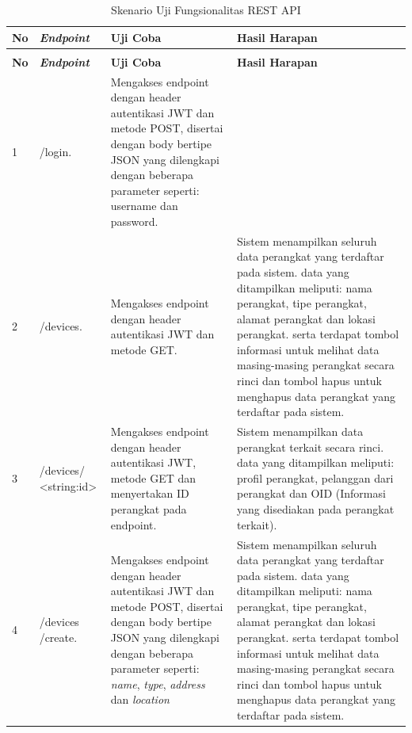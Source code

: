             \begin{longtable}{|p{}|p{}|p{}|p{}|}					\caption{Skenario Uji Fungsionalitas REST API} \label{ujirestapi} \\
            	\hline
            	\textbf{No} & \textbf{\textit{Endpoint}} & \textbf{Uji Coba} & \textbf{Hasil Harapan} \\ \hline
            	\endfirsthead
            	\caption[]{Skenario Uji Fungsionalitas REST API} \\
            	\hline
            	\textbf{No} & \textbf{\textit{Endpoint}} & \textbf{Uji Coba} & \textbf{Hasil Harapan} \\ \hline
            	\endhead
            	\endfoot
            	\endlastfoot
            	
            	1 & /login. & Mengakses endpoint dengan header autentikasi JWT dan metode POST, disertai dengan body bertipe JSON yang dilengkapi dengan beberapa parameter seperti: username dan password.\\ \hline
            	2 & /devices. & Mengakses endpoint dengan header autentikasi JWT dan metode GET. & Sistem menampilkan seluruh data perangkat yang terdaftar pada sistem. data yang ditampilkan meliputi: nama perangkat, tipe perangkat, alamat perangkat dan lokasi perangkat. serta terdapat tombol informasi untuk melihat data masing-masing perangkat secara rinci dan tombol hapus untuk menghapus data perangkat yang terdaftar pada sistem. \\ \hline
            	3 & /devices/ <string:id> & Mengakses endpoint dengan header autentikasi JWT, metode GET dan menyertakan ID perangkat pada endpoint. & Sistem menampilkan data perangkat terkait secara rinci. data yang ditampilkan meliputi: profil perangkat, pelanggan dari perangkat dan OID (Informasi yang disediakan pada perangkat terkait). \\ \hline
            	4 & /devices /create. & Mengakses endpoint dengan header autentikasi JWT dan metode POST, disertai dengan body bertipe JSON yang dilengkapi dengan beberapa parameter seperti: \textit{name}, \textit{type}, \textit{address} dan \textit{location} & Sistem menampilkan seluruh data perangkat yang terdaftar pada sistem. data yang ditampilkan meliputi: nama perangkat, tipe perangkat, alamat perangkat dan lokasi perangkat. serta terdapat tombol informasi untuk melihat data masing-masing perangkat secara rinci dan tombol hapus untuk menghapus data perangkat yang terdaftar pada sistem. \\ \hline

\end{longtable}
